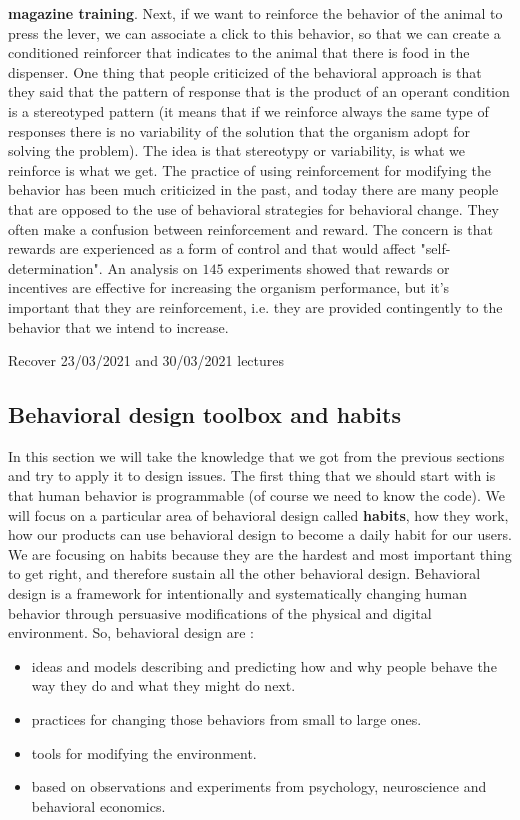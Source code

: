 \documentclass[11pt]{article}
\begin{document}
\textbf{magazine training}. Next, if we want to reinforce the behavior of the animal to press the lever, we can associate a click to this behavior, so that we can create a conditioned reinforcer that indicates to the animal that there is food in the dispenser. One thing that people criticized of the behavioral approach is that they said that the pattern of response that is the product of an operant condition is a stereotyped pattern (it means that if we reinforce always the same type of responses there is no variability of the solution that the organism adopt for solving the problem). The idea is that stereotypy or variability, is what we reinforce is what we get. The practice of using reinforcement for modifying the behavior has been much criticized in the past, and today there are many people that are opposed to the use of behavioral strategies for behavioral change. They often make a confusion between reinforcement and reward. The concern is that rewards are experienced as a form of control and that would affect "self-determination". An analysis on $145$ experiments showed that rewards or incentives are effective for increasing the organism performance, but it's important that they are reinforcement, i.e. they are provided contingently to the behavior that we intend to increase. 

Recover 23/03/2021 and 30/03/2021 lectures

\subsection{Behavioral design toolbox and habits}
In this section we will take the knowledge that we got from the previous sections and try to apply it to design issues. The first thing that we should start with is that human behavior is programmable (of course we need to know the code). We will focus on a particular area of behavioral design called \textbf{habits}, how they work, how our products can use behavioral design to become a daily habit for our users. We are focusing on habits because they are the hardest and most important thing to get right, and therefore sustain all the other behavioral design. Behavioral design is a framework for intentionally and systematically changing human behavior through persuasive modifications of the physical 
and digital environment. So, behavioral design are :

\begin{itemize}
\item ideas and models describing and predicting how and why people behave the way they do and what they might do next.

\item practices for changing those behaviors from small to large ones.

\item tools for modifying the environment.

\item based on observations and experiments from psychology, neuroscience and behavioral economics. 
\end{itemize}
\end{document}
